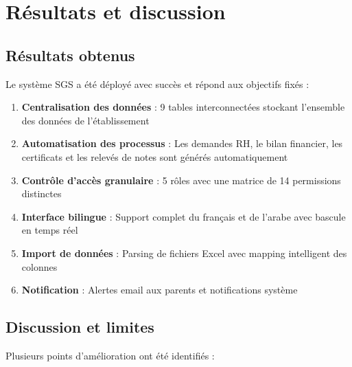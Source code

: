 \documentclass[12pt,a4paper]{report}
\begin{document}
\chapter{Résultats et discussion}

\section{Résultats obtenus}

Le système SGS a été déployé avec succès et répond aux objectifs fixés :

\begin{enumerate}
    \item \textbf{Centralisation des données} : 9 tables interconnectées stockant l'ensemble des données de l'établissement
    \item \textbf{Automatisation des processus} : Les demandes RH, le bilan financier, les certificats et les relevés de notes sont générés automatiquement
    \item \textbf{Contrôle d'accès granulaire} : 5 rôles avec une matrice de 14 permissions distinctes
    \item \textbf{Interface bilingue} : Support complet du français et de l'arabe avec bascule en temps réel
    \item \textbf{Import de données} : Parsing de fichiers Excel avec mapping intelligent des colonnes
    \item \textbf{Notification} : Alertes email aux parents et notifications système
\end{enumerate}

\section{Discussion et limites}

Plusieurs points d'amélioration ont été identifiés :
\end{document}
